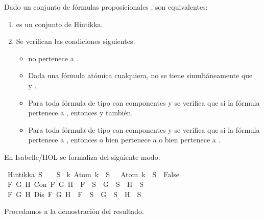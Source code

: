 \begin{isabellebody}
\begin{isamarkuptext}
  \begin{lema}
    Dado un conjunto de fórmulas proposicionales , son equivalentes:
    \begin{enumerate}
      \item {} es un conjunto de Hintikka.
      \item Se verifican las condiciones siguientes:
      \begin{itemize}
        \item \isa{{\isasymbottom}} no pertenece a .
        \item Dada  una fórmula atómica cualquiera, no se tiene 
        simultáneamente que\\  y .
        \item Para toda fórmula de tipo \isa{{\isasymalpha}} con componentes  y  se verifica 
        que si la fórmula pertenece a , entonces  y  también.
        \item Para toda fórmula de tipo \isa{{\isasymbeta}} con componentes  y  se verifica 
        que si la fórmula pertenece a , entonces o bien  pertenece
        a  o bien  pertenece a .
      \end{itemize} 
    \end{enumerate}
  \end{lema}

  En Isabelle/HOL se formaliza del siguiente modo.%
\end{isamarkuptext}\isamarkuptrue%
\isamarkupfalse%
\ {\isachardoublequoteopen}Hintikka\ S\ {\isacharequal}\ {\isacharparenleft}{\isasymbottom}\ {\isasymnotin}\ S\isanewline
{\isasymand}\ {\isacharparenleft}{\isasymforall}k{\isachardot}\ Atom\ k\ {\isasymin}\ S\ {\isasymlongrightarrow}\ \isactrlbold {\isasymnot}\ {\isacharparenleft}Atom\ k{\isacharparenright}\ {\isasymin}\ S\ {\isasymlongrightarrow}\ False{\isacharparenright}\isanewline
{\isasymand}\ {\isacharparenleft}{\isasymforall}F\ G\ H{\isachardot}\ Con\ F\ G\ H\ {\isasymlongrightarrow}\ F\ {\isasymin}\ S\ {\isasymlongrightarrow}\ G\ {\isasymin}\ S\ {\isasymand}\ H\ {\isasymin}\ S{\isacharparenright}\isanewline
{\isasymand}\ {\isacharparenleft}{\isasymforall}F\ G\ H{\isachardot}\ Dis\ F\ G\ H\ {\isasymlongrightarrow}\ F\ {\isasymin}\ S\ {\isasymlongrightarrow}\ G\ {\isasymin}\ S\ {\isasymor}\ H\ {\isasymin}\ S{\isacharparenright}{\isacharparenright}{\isachardoublequoteclose}\ \isanewline
%
\isadelimproof
\ \ %
\endisadelimproof
%
\isatagproof
{}\isamarkupfalse%
%
\endisatagproof
{\isafoldproof}%
%
\isadelimproof
%
\endisadelimproof
%
\begin{isamarkuptext}%
Procedamos a la demostración del resultado.


\end{isamarkuptext}
\end{isabellebody}
